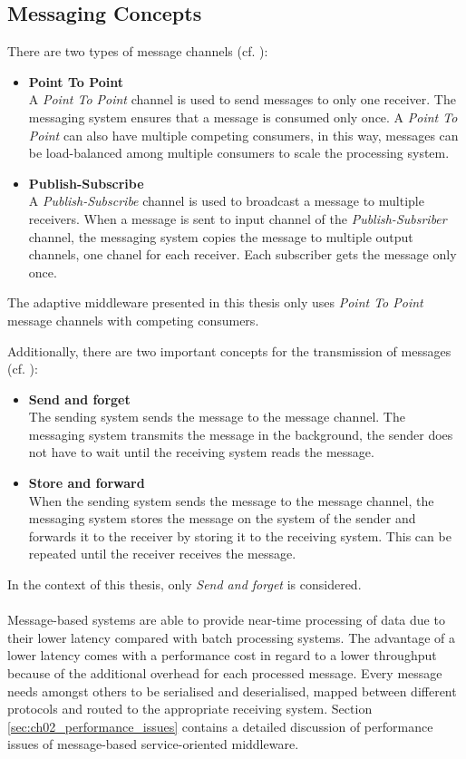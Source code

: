 \subsection{Messaging Concepts}

There are two types of message channels (cf. \cite{Hohpe:2003fk}):

\begin{itemize}
	\item \textbf{Point To Point}\\
	A \emph{Point To Point} channel is used to send messages to only one receiver. The messaging system ensures that a message is consumed only once. A \emph{Point To Point} can also have multiple competing consumers, in this way, messages can be load-balanced among multiple consumers to scale the processing system. 
	\item \textbf{Publish-Subscribe}\\
	A \emph{Publish-Subscribe} channel is used to broadcast a message to multiple receivers. When a message is sent to input channel of the \emph{Publish-Subsriber} channel, the messaging system copies the message to multiple output channels, one chanel for each receiver. Each subscriber gets the message only once.
\end{itemize}

The adaptive middleware presented in this thesis only uses \emph{Point To Point} message channels with competing consumers.

Additionally, there are two important concepts for the transmission of messages (cf. \cite{Hohpe:2003fk}):

\begin{itemize}
	\item \textbf{Send and forget}\\
	The sending system sends the message to the message channel. The messaging system transmits the message in the background, the sender does not have to wait until the receiving system reads the message.
	\item \textbf{Store and forward}\\
	When the sending system sends the message to the message channel, the messaging system stores the message on the system of the sender and forwards it to the receiver by storing it to the receiving system. This can be repeated until the receiver receives the message.
\end{itemize}

In the context of this thesis, only \emph{Send and forget} is considered.
\\\\
Message-based systems are able to provide near-time processing of data due to their lower latency compared with batch processing systems. The advantage of a lower latency comes with a performance cost in regard to a lower throughput because of the additional overhead for each processed message. Every message needs amongst others to be serialised and deserialised, mapped between different protocols and routed to the appropriate receiving system. Section \ref{sec:ch02_performance_issues} contains a detailed discussion of performance issues of message-based service-oriented middleware.

